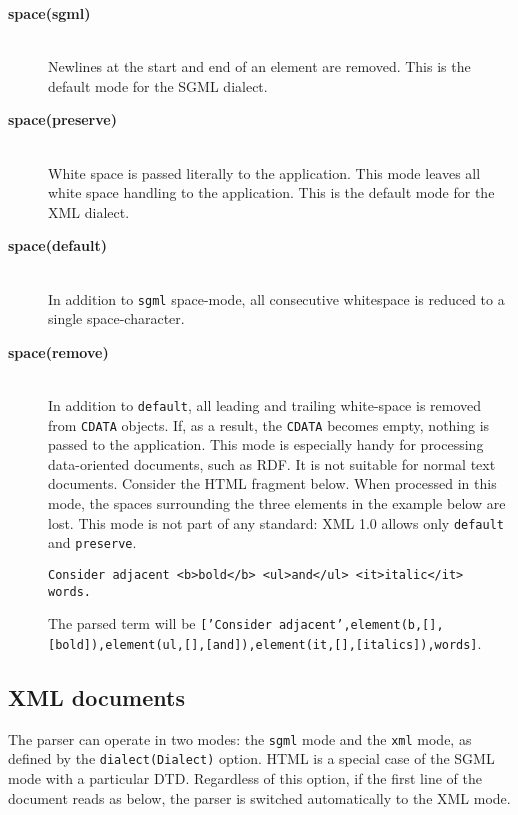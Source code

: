 \begin{description}
\item[{\bf space}{\bf (sgml)}]\mbox{}\\
  Newlines at the start and end of an element are removed.
    This is the default mode for the SGML dialect. 

\item[{\bf space}{\bf (preserve)}]\mbox{}\\
  White space is passed literally to the application. This mode leaves all
  white space handling to the application. This is the default mode for
  the XML dialect. 

\item[{\bf space}{\bf (default)}]\mbox{}\\
  In addition to {\tt sgml} space-mode, all consecutive whitespace is 
  reduced to a single space-character.

\item[{\bf space}{\bf (remove)}]\mbox{}\\
  In addition to {\tt default}, all leading and trailing white-space is 
  removed from {\tt CDATA} objects. If, as a result, the {\tt CDATA} 
  becomes empty, nothing is passed to the application. This mode is 
  especially handy for processing data-oriented documents, such as RDF. 
  It is not suitable for normal text documents. Consider the HTML 
  fragment below. When processed in this mode, the spaces surrounding the 
  three elements in the example below are lost.  This mode is not part of
  any standard: XML 1.0 allows only {\tt default} and {\tt preserve}.
\begin{verbatim}
Consider adjacent <b>bold</b> <ul>and</ul> <it>italic</it> words.
\end{verbatim}
  The parsed term will be
  {\tt ['Consider adjacent',element(b,[],[bold]),element(ul,[],[and]),element(it,[],[italics]),words]}.


\end{description}

\subsection{XML documents}\label{sec:xml}

The parser can operate in two modes:
the {\tt sgml} mode and
the {\tt xml} mode, as 
defined by the {\tt dialect(Dialect)} option. HTML is a special case of
the SGML mode with a particular DTD. Regardless of this 
option, if the first line of the document reads as below, the parser is 
switched automatically to the XML mode.


